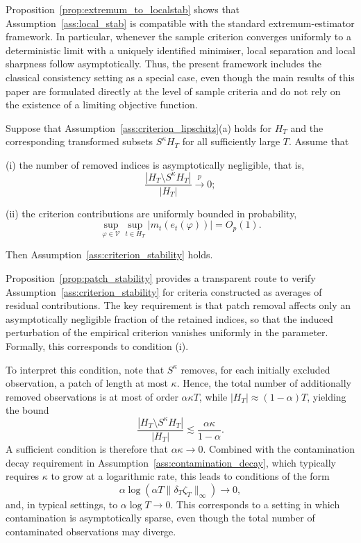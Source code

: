 \documentclass[12pt]{article}
\numberwithin{equation}{section}
\begin{document}
Proposition~\ref{prop:extremum_to_localstab} shows that Assumption~\ref{ass:local_stab} is compatible with the standard extremum-estimator framework. 
In particular, whenever the sample criterion converges uniformly to a deterministic limit with a uniquely identified minimiser, local separation and local sharpness follow asymptotically. 
Thus, the present framework includes the classical consistency setting as a special case, even though the main results of this paper are formulated directly at the level of sample criteria and do not rely on the existence of a limiting objective function.

\begin{proposition}
\label{prop:patch_stability}
Suppose that Assumption~\ref{ass:criterion_lipschitz}(a) holds for $H_T$ and the corresponding transformed subsets $S^\kappa H_T$ for all sufficiently large $T$.
Assume that

\noindent
(i) the number of removed indices is asymptotically negligible, that is,
\begin{equation}
\frac{|H_T\setminus S^\kappa H_T|}{|H_T|}
\overset{p}{\longrightarrow}0;
\end{equation}

\noindent
(ii) the criterion contributions are uniformly bounded in probability,
\begin{equation}
\sup_{\varphi\in\mathcal V}\sup_{t\in H_T}
\bigl|m_t(e_t(\varphi))\bigr|
=
O_p(1).
\end{equation}

Then Assumption~\ref{ass:criterion_stability} holds.
\end{proposition}

Proposition~\ref{prop:patch_stability} provides a transparent route to verify Assumption~\ref{ass:criterion_stability} for criteria constructed as averages of residual contributions. 
The key requirement is that patch removal affects only an asymptotically negligible fraction of the retained indices, so that the induced perturbation of the empirical criterion vanishes uniformly in the parameter. 
Formally, this corresponds to condition (i).

To interpret this condition, note that $S^\kappa$ removes, for each initially excluded observation, a patch of length at most $\kappa$. 
Hence, the total number of additionally removed observations is at most of order $\alpha \kappa T$, while $|H_T| \approx (1-\alpha)T$, yielding the bound
\begin{equation}
\frac{|H_T\setminus S^\kappa H_T|}{|H_T|}
\lesssim
\frac{\alpha \kappa}{1-\alpha}.
\end{equation}
A sufficient condition is therefore that $\alpha \kappa \to 0$. 
Combined with the contamination decay requirement in Assumption~\ref{ass:contamination_decay}, which typically requires $\kappa$ to grow at a logarithmic rate, this leads to conditions of the form
\begin{equation}
\alpha \log(\alpha T \|\delta_T \zeta_T\|_\infty) \to 0,
\end{equation}
and, in typical settings, to $\alpha \log T \to 0$. 
This corresponds to a setting in which contamination is asymptotically sparse, even though the total number of contaminated observations may diverge.
\end{document}
